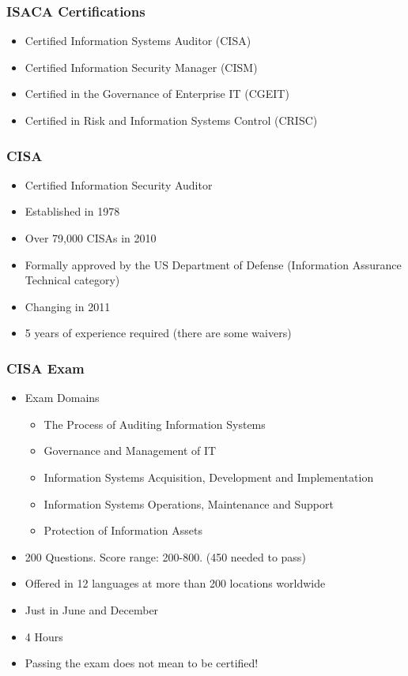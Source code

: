 \documentclass{beamer}
\begin{document}

\begin{frame}
\frametitle{ISACA Certifications}
\begin{itemize}
\item Certified Information Systems Auditor (CISA)
\item Certified Information Security Manager (CISM)
\item Certified in the Governance of Enterprise IT (CGEIT)
\item Certified in Risk and Information Systems Control (CRISC)
\end{itemize}
\end{frame}



\begin{frame}
\frametitle{CISA}
\begin{itemize}
\item Certified Information Security Auditor
\item Established in 1978
\item Over 79,000 CISAs in 2010
\item Formally approved by the US Department of Defense (Information Assurance Technical category)
\item Changing in 2011
\item 5 years of experience required (there are some waivers)
\end{itemize}
\end{frame}




\begin{frame}
\frametitle{CISA Exam}
\begin{itemize}
\item Exam Domains
\begin{itemize}
\item The Process of Auditing Information Systems
\item Governance and Management of IT
\item Information Systems Acquisition, Development and Implementation
\item Information Systems Operations, Maintenance and Support
\item Protection of Information Assets
\end{itemize}
\item 200 Questions. Score range: 200-800. (450 needed to pass)
\item Offered in 12 languages at more than 200 locations worldwide
\item Just in June and December
\item 4 Hours
\item Passing the exam does not mean to be certified!
\end{itemize}
\end{frame}
\end{document}
